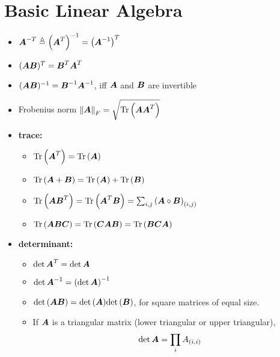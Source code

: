 \documentclass{article}
\begin{document}



\section{Basic Linear Algebra}
\begin{itemize}
  \item $ \vA^{-T} \triangleq \group{\vA^T}^{-1} = \group{\vA^{-1}}^{T} $
  \item $ (\vA \vB)^{T} = \vB^{T} \vA^{T} $
  \item $ (\vA \vB)^{-1} = \vB^{-1} \vA^{-1} $,
    iff $ \vA$ and $\vB$ are invertible
  \item Frobenius norm $ \fnorm{\vA} = \sqrt{\Tr{\vA \vA^T}}$
  \item \textbf{trace:}
  \begin{itemize}
    \let\labelitemii\labelitemi
    \item $ \Tr{\vA^{T}} = \Tr{\vA} $
    \item $ \Tr{\vA + \vB} = \Tr{\vA} + \Tr{\vB} $
    \item $ \Tr{\vA \vB^{T}} = \Tr{\vA^{T} \vB} =
      \sum_{i,j}{\group{\vA \circ \vB}_{(i,j)}} $
    \item $ \Tr{\vA \vB \vC} = \Tr{\vC \vA \vB} = \Tr{\vB \vC \vA} $
  \end{itemize}
  \item \textbf{determinant:}
  \begin{itemize}
    \item $ \det{\vA^T} = \det{\vA} $
    \item $ \det{\vA^{-1}} = \group{\det{\vA}}^{-1} $
    \item $ \func{\det}{\vA \vB} = \func{\det}{\vA} \func{\det}{\vB} $,
      for square matrices of equal size.
    \item If $\vA$ is a triangular matrix (lower triangular or upper triangular),
    $$ \det{\vA} = \prod_i{A_{(i,i)}}$$
  \end{itemize}
\end{itemize}
\end{document}
